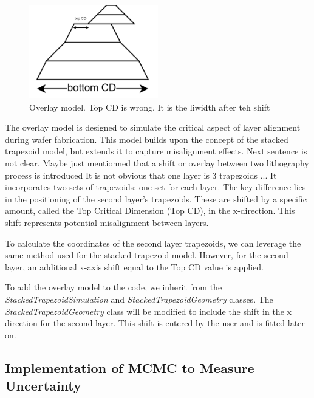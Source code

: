 \begin{figure}[h]
    \centering
    \includegraphics[width=0.5\textwidth]{images/overlay.PNG}
    \caption{Overlay model. \color{red} Top CD is wrong. It is the liwidth after teh shift \color{black} 
    }
    \label{fig:overlay}
\end{figure}

\FloatBarrier

The overlay model is designed to simulate the critical aspect of layer alignment during wafer 
fabrication. This model builds upon the concept of the stacked trapezoid model, but extends it to 
capture misalignment effects. 
\color{red} Next sentence is not clear. Maybe just mentionned that a shift or overlay between two lithography process is introduced
It is not obvious that one layer is 3 trapezoids ...\color{black}
It incorporates two sets of trapezoids: one set for each layer. The 
key difference lies in the positioning of the second layer's trapezoids. These are shifted by a 
specific amount, called the Top Critical Dimension (Top CD), in the x-direction. This shift 
represents potential misalignment between layers.

\medskip

To calculate the coordinates of the second layer trapezoids, we can leverage the same method 
used for the stacked trapezoid model. However, for the second layer, an additional x-axis shift 
equal to the Top CD value is applied.

\medskip

To add the overlay model to the code, we inherit from the \textit{StackedTrapezoidSimulation} and \textit{StackedTrapezoidGeometry} classes.
The \textit{StackedTrapezoidGeometry} class will be modified to include the shift in the x direction for the second layer. This shift is entered by the
user and is fitted later on.

\subsection{Implementation of MCMC to Measure Uncertainty}

